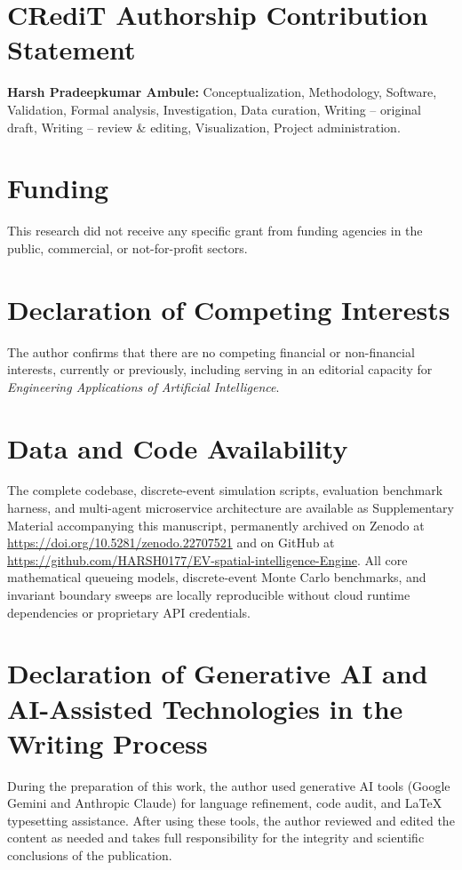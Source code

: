 \documentclass[preprint,12pt,authoryear]{elsarticle}
\begin{document}
\section*{CRediT Authorship Contribution Statement}
\textbf{Harsh Pradeepkumar Ambule:} Conceptualization, Methodology, Software, Validation, Formal analysis, Investigation, Data curation, Writing -- original draft, Writing -- review \& editing, Visualization, Project administration.

\section*{Funding}
This research did not receive any specific grant from funding agencies in the public, commercial, or not-for-profit sectors.

\section*{Declaration of Competing Interests}
The author confirms that there are no competing financial or non-financial interests, currently or previously, including serving in an editorial capacity for \textit{Engineering Applications of Artificial Intelligence}.

\section*{Data and Code Availability}
The complete codebase, discrete-event simulation scripts, evaluation benchmark harness, and multi-agent microservice architecture are available as Supplementary Material accompanying this manuscript, permanently archived on Zenodo at \url{https://doi.org/10.5281/zenodo.22707521} and on GitHub at \url{https://github.com/HARSH0177/EV-spatial-intelligence-Engine}. All core mathematical queueing models, discrete-event Monte Carlo benchmarks, and invariant boundary sweeps are locally reproducible without cloud runtime dependencies or proprietary API credentials.

\section*{Declaration of Generative AI and AI-Assisted Technologies in the Writing Process}
During the preparation of this work, the author used generative AI tools (Google Gemini and Anthropic Claude) for language refinement, code audit, and LaTeX typesetting assistance. After using these tools, the author reviewed and edited the content as needed and takes full responsibility for the integrity and scientific conclusions of the publication.
\end{document}
